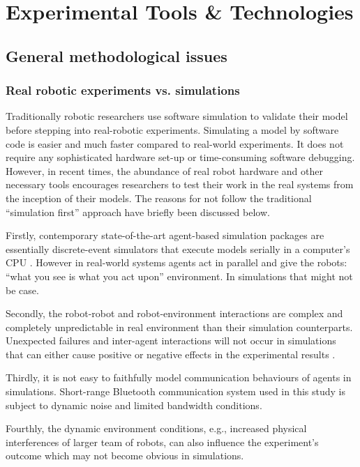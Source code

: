\chapter{Experimental Tools \& Technologies}
\label{expt-tools}
\section{General methodological issues}
\subsection{Real robotic experiments vs. simulations}
Traditionally robotic researchers use software simulation to validate their model before stepping into real-robotic experiments. Simulating a model by software code is easier and much faster compared to real-world experiments. It does not require any sophisticated hardware set-up or time-consuming software debugging. However, in recent times, the abundance of real robot hardware and other necessary tools encourages researchers to test their work in the real systems from the inception of their models. The reasons for not follow the traditional ``simulation first'' approach have briefly been discussed below. 

Firstly, contemporary state-of-the-art agent-based simulation packages are essentially discrete-event simulators that execute models serially in a computer's CPU \cite{Lysenko+2008}. However in real-world systems agents act in parallel and give the robots:  ``what you see is what you act upon'' environment. In simulations that might not be case.

Secondly, the robot-robot and robot-environment interactions are complex and completely unpredictable in real environment than their simulation counterparts. Unexpected failures and inter-agent interactions will not occur in simulations that can either cause positive or negative effects in the experimental results \cite{Krieger+2000}.

Thirdly, it is not easy to faithfully model communication behaviours of agents in simulations. Short-range Bluetooth communication system used in this study is subject to dynamic noise and limited bandwidth conditions.

Fourthly, the dynamic environment conditions, e.g., increased physical interferences of larger team of robots, can also influence the experiment's outcome which may not become obvious in simulations.

